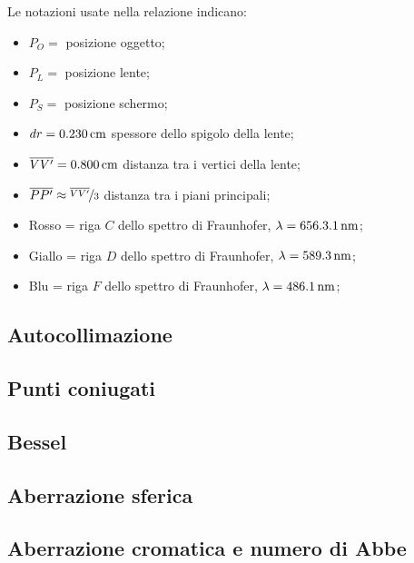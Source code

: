 Le notazioni usate nella relazione indicano:
\begin{itemize}
\item $P_O =$ posizione oggetto;
\item $P_L =$ posizione lente;
\item $P_S =$ posizione schermo;
\item $dr = 0.230 \,\mathrm{cm}$ spessore dello spigolo della lente;
\item $\overline{VV'} = 0.800 \,\mathrm{cm}$ distanza tra i vertici della lente;
\item $\overline{PP'} \approx \nicefrac{\overline{VV'}}{3}$ distanza tra i piani principali;
\item Rosso = riga $C$ dello spettro di Fraunhofer, $\lambda = 656.3.1 \,\mathrm{nm}$;
\item Giallo = riga $D$ dello spettro di Fraunhofer, $\lambda = 589.3 \,\mathrm{nm}$;
\item Blu = riga $F$ dello spettro di Fraunhofer, $\lambda = 486.1 \,\mathrm{nm}$;
\end{itemize}
\FloatBarrier
\subsection{Autocollimazione}
\label{subsec:autocollimazione}

\FloatBarrier
\subsection{Punti coniugati}

\FloatBarrier
\subsection{Bessel}

\FloatBarrier
\subsection{Aberrazione sferica}
\label{subsec:aberrazione_sferica}

\FloatBarrier
\subsection{Aberrazione cromatica e numero di Abbe}

